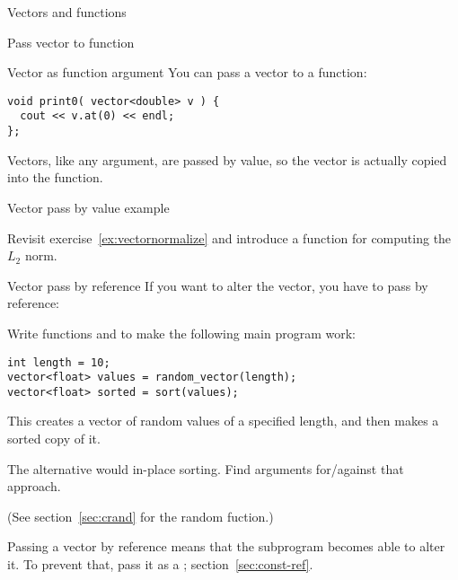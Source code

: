  {Vectors and functions}

 {Pass vector to function}

\begin{block}{Vector as function argument}
  \label{sl:vector-arg}
  You can pass a vector to a function:
\begin{lstlisting}
void print0( vector<double> v ) {
  cout << v.at(0) << endl;
};
\end{lstlisting}
Vectors, like any argument, are passed by value, so the vector is
actually copied into the function.
\end{block}

\begin{block}{Vector pass by value example}
  \label{sl:vector-arg-ex}
\end{block}

\begin{exercise}
  \label{ex:vectornormalize-function}
  Revisit exercise~\ref{ex:vectornormalize} and introduce a function
  for computing the $L_2$ norm.
\end{exercise}

\begin{block}{Vector pass by reference}
  \label{sl:vector-arg-ref}
  If you want to alter the vector, you have to pass by reference:
\end{block}

\begin{exercise}
  \label{ex:vec-rand-sort}
  Write functions  and  to make the following
  main program work:
\begin{lstlisting}
int length = 10;
vector<float> values = random_vector(length);
vector<float> sorted = sort(values);
\end{lstlisting}
  This creates a vector of random values of a specified length, and
  then makes a sorted copy of it.

  The alternative would in-place sorting. Find
  arguments for/against that approach.

\end{exercise}

(See section~\ref{sec:crand} for the random fuction.)

Passing a vector by reference means that the subprogram becomes able
to alter it. To prevent that, pass it as a
; section~\ref{sec:const-ref}.

